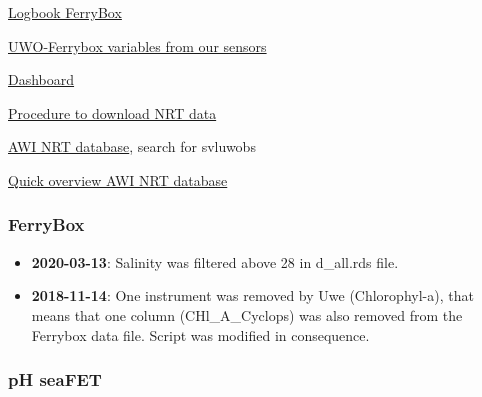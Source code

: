 \documentclass[
]{article}
\providecommand{\tightlist}{%
  \setlength{\itemsep}{0pt}\setlength{\parskip}{0pt}}
\begin{document}
\href{https://docs.google.com/spreadsheets/d/1QwAJm7TttoEwue-CUM0efhqEAMwj5m148Gy_Mp-1maM/edit?ts=5ed0fca6\#gid=2036495380}{Logbook
FerryBox}

\href{https://docs.google.com/spreadsheets/d/1arKYfUjmg3YrgQ5g9LN_XFwUORyz7nqlKNWq3uYok3U/edit?ts=5c7e1d16\#gid=393659093}{UWO-Ferrybox
variables from our sensors}

\href{https://dashboard.awi.de/?dashboard=3760}{Dashboard}

\href{https://spaces.awi.de/confluence/display/MOS/NRT+data+download+procedures}{Procedure
to download NRT data}

\href{https://dashboard.awi.de/data-xxl/}{AWI NRT database}, search for
svluwobs

\href{https://dashboard.awi.de/?dashboard=9736}{Quick overview AWI NRT
database}

\hypertarget{ferrybox-1}{%
\subsubsection{\texorpdfstring{\textbf{FerryBox}}{FerryBox}}\label{ferrybox-1}}

\begin{itemize}
\tightlist
\item
  \textbf{2020-03-13}: Salinity was filtered above 28 in d\_all.rds
  file.
\item
  \textbf{2018-11-14}: One instrument was removed by Uwe (Chlorophyl-a),
  that means that one column (CHl\_A\_Cyclops) was also removed from the
  Ferrybox data file. Script was modified in consequence.
\end{itemize}

\hypertarget{ph-seafet-2}{%
\subsubsection{\texorpdfstring{\textbf{pH
seaFET}}{pH seaFET}}\label{ph-seafet-2}}
\end{document}
